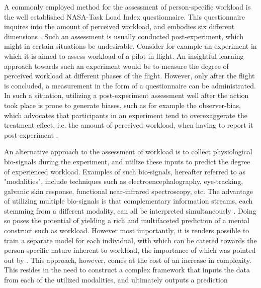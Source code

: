 \documentclass[12pt]{article}
\begin{document}
A commonly employed method for the assessment of person-specific workload is the well established NASA-Task Load Index questionnaire. This questionnaire inquires into the amount of perceived workload,  and embodies six different dimensions \cite{hart2006nasa}. Such an assessment is usually conducted post-experiment, which might in certain situations be undesirable. Consider for example an experiment in which it is aimed to assess workload of a pilot in flight. An insightful learning approach towards such an experiment would be to measure the degree of perceived workload at different phases of the flight. However, only after the flight is concluded, a measurement in the form of a questionnaire can be administrated. In such a situation, utilizing a post-experiment assessment well after the action took place is prone to generate biases, such as for example the observer-bias, which advocates that participants in an experiment tend to overexaggerate the treatment effect, i.e. the amount of perceived workload, when having to report it post-experiment \cite{mahtani2018catalogue}.

An alternative approach to the assessment of workload is to collect physiological bio-signals during the experiment, and utilize these inputs to predict the degree of experienced workload. Examples of such bio-signals, hereafter referred to as "modalities", include techniques such as electroencephalography, eye-tracking, galvanic skin response, functional near-infrared spectroscopy, etc. The advantage of utilizing multiple bio-signals is that complementary information streams, each stemming from a different modality, can all be interpreted simultaneously \cite{ramachandram2017deep}. Doing so poses the potential of yielding a rich and multifaceted prediction of a mental construct such as workload. However most importantly, it is renders possible to train a separate model for each individual, with which can be catered towards the person-specific nature inherent to workload, the importance of which was pointed out by . This approach, however, comes at the cost of an increase in complexity. This resides in the need to construct a complex framework that inputs the data from each of the utilized modalities, and ultimately outputs a prediction
\end{document}
